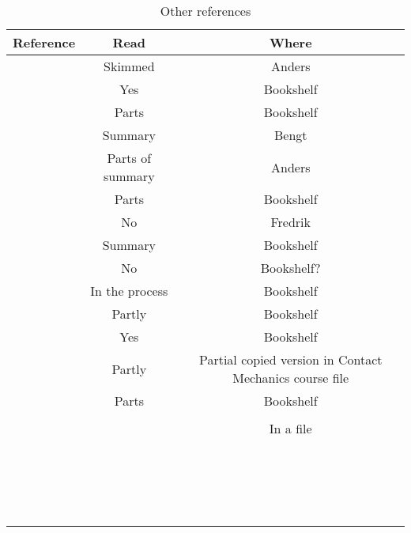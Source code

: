 \documentclass{article}
\begin{document}


\begin{table}
\caption{Other references}
\label{tab:other}
\centering
\begin{tabular}{c|c|c}
Reference & Read & Where\\ \hline
\citet{Lunden1991} & Skimmed & Anders \\
\citet{Wriggers2006book} & Yes & Bookshelf \\
\citet{DoneaHuerta2003book} & Parts & Bookshelf \\
\citet{Jergeus1998phd} & Summary & Bengt \\
\citet{Ahlstrom2001phd} & Parts of summary & Anders \\
\citet{Vernersson2006phd} & Parts & Bookshelf \\
\citet{Hakansson2007phd} & No & Fredrik \\
\citet{Caprioli2011lic} & Summary & Bookshelf \\
\citet{Petersson1999lic} & No & Bookshelf? \\
\citet{Brenner2008book} & In the process & Bookshelf \\
\citet{Johnson1987book} & Partly & Bookshelf \\
\citet{OttosenPetersson1992book} & Yes & Bookshelf \\
\citet{Timoshenko1951book} & Partly & Partial copied version in Contact Mechanics course file \\
\citet{Ziegler1983book} & Parts & Bookshelf \\
\citet{AmsdenHirt1973book} & &  \\
\citet{Hetnarski2008book} &  & In a file \\
\citet{CraigKurdila2006book} &  &  \\
\citet{Marsden1994book} &  &  \\
\citet{BonetWood2008book} &  &  \\
\citet{Fromm1927book} &  &  \\
\citet{Love1944book} &  &  \\
\citet{Coulomb1821book} &  &  \\
\citet{Zienkiewicz2013book} &  &  \\
\citet{Boussinesq1885book}
\citet{Cook2001book} &  &  \\
\citet{Matlab2014} &  &  \\
\citet{Suwannachit2013phd} &  &  \\
\citet{Lundberg1958book} &  &  \\
\citet{Popov2010book} &  &  \\
\citet{Gladwell1980book} &  &  \\
\citet{Kalker1967phd} &  &  \\
\citet{Kane1994book} &  &  \\
\citet{DuvautLions1976book} &  &  \\
\citet{Trulio1966book} &  &  \\
\citet{Roge1990phd} &  &  \\
\end{tabular}
\end{table}
\end{document}

